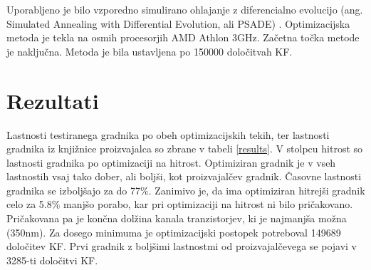 \documentclass[journal,a4paper,twoside]{template/IEEEtran}
\begin{document}
Uporabljeno je bilo vzporedno simulirano ohlajanje z diferencialno evolucijo (ang. Simulated Annealing with Differential Evolution, ali PSADE) \cite{olensek}. Optimizacijska metoda je tekla na osmih procesorjih AMD Athlon 3GHz. Začetna točka metode je naključna. Metoda je bila ustavljena po 150000 določitvah KF.

\section{Rezultati}
Lastnosti testiranega gradnika po obeh optimizacijskih tekih, ter lastnosti gradnika iz knjižnice proizvajalca so zbrane v tabeli \ref{results}. V stolpcu hitrost so lastnosti gradnika po optimizaciji na hitrost. Optimiziran gradnik je v vseh lastnostih vsaj tako dober, ali boljši, kot proizvajalčev gradnik. Časovne lastnosti gradnika se izboljšajo za do 77\%. Zanimivo je, da ima optimiziran hitrejši gradnik celo za 5.8\% manjšo porabo, kar pri optimizaciji na hitrost ni bilo pričakovano. Pričakovana pa je končna dolžina kanala tranzistorjev, ki je najmanjša možna (350nm). Za dosego minimuma je optimizacijski postopek potreboval 149689 določitev KF. Prvi gradnik z boljšimi lastnostmi od proizvajalčevega se pojavi v 3285-ti določitvi KF.
\end{document}
